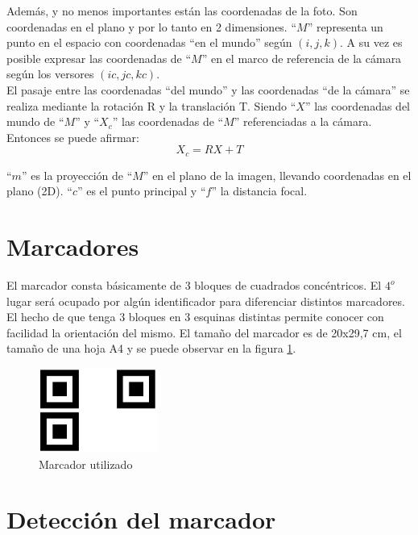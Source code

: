 \documentclass[main]{subfiles}
\begin{document}
Además, y no menos importantes están las coordenadas de la foto. Son coordenadas en el plano y por lo tanto en 2 dimensiones. ``$M$'' representa un punto en el espacio con coordenadas ``en el mundo'' según $(i,j,k)$. A su vez es posible expresar las coordenadas de ``$M$'' en el marco de referencia de la cámara según los versores $(ic,jc,kc)$.\\

El pasaje entre las coordenadas ``del mundo'' y las coordenadas ``de la cámara'' se realiza mediante la rotación R y la translación T.
Siendo ``$X$'' las coordenadas del mundo de ``$M$'' y ``$X_c$'' las coordenadas de ``$M$'' referenciadas a la cámara. Entonces se puede afirmar:
$$X_c = R X + T$$

``$m$'' es la proyección de ``$M$'' en el plano de la imagen, llevando coordenadas en el plano (2D). ``$c$'' es el punto principal y ``$f$'' la distancia focal.

\section{Marcadores}

El marcador consta básicamente de 3 bloques de cuadrados concéntricos. El $4^o$ lugar será ocupado por algún identificador para diferenciar distintos marcadores. El hecho de que tenga 3 bloques en 3 esquinas distintas permite conocer con facilidad la orientación del mismo. El tamaño del marcador es de 20x29,7 cm, el tamaño de una hoja A4 y se puede observar en la figura \ref{fig:marcador}.

\begin{figure}
	\begin{center}
		\includegraphics[width=0.35\textwidth]{./pics_camara/marcador.jpg}
	\end{center}
	\caption{Marcador utilizado}
	\label{fig:marcador}
\end{figure}

\section{Detección del marcador}
\end{document}
